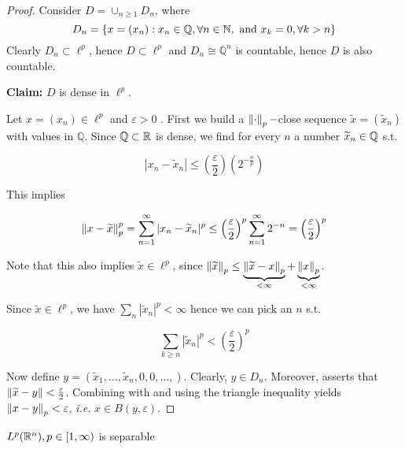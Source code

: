 \documentclass{article}
\begin{document}
\begin{proof}
	Consider \(D = \cup_{n\geq 1} D_n\), where  
	\[ D_n = \{x=(x_n): x_n \in \mathbb{Q}, \forall n \in \mathbb{N}, \ \text{and} \ x_k=0, \forall k >n\}\]
 Clearly $D_n \subset \ell^p$, hence $D\subset \ell^p$ and $D_n \cong \mathbb{Q}^n$ is countable, hence $D$ is also countable.   

\textbf{Claim:} $D$ is dense in $\ell^p$.  

Let $x = (x_n) \in \ell^p$ and $\varepsilon >0$ . First we build a $\left\|{\cdot}\right\|_p-$close sequence $\widetilde{x}=(\widetilde{x}_n)$ with values in $\mathbb{Q}$. Since $\mathbb{Q} \subset \mathbb{R}$ is dense, we find for every $n$ a number $\widetilde{x}_n \in \mathbb{Q}$ s.t.  

$$
|x_n-\widetilde{x}_n| \leq \left(\frac{\varepsilon}{2}\right) (2^{-\frac{n}{p}})
$$  

This implies  

\begin{equation}
\label{1}
    \left\|{x-\widetilde{x}}\right\|_p^p = \sum_{n=1}^{\infty} |x_n-\widetilde{x}_n|^p \leq \left(\frac{\varepsilon}{2}\right)^p \sum_{n=1}^{\infty} 2^{-n}=\left(\frac{\varepsilon}{2}\right)^p
\end{equation}

Note that this also implies $\widetilde{x} \in \ell^p$, since $\left\|{\widetilde{x}}\right\|_p \leq \underbrace{\left\|{\widetilde{x}-x}\right\|_p}_{<\infty}+\underbrace{\left\|{x}\right\|_p}_{<\infty}$.  

Since $\widetilde{x} \in \ell^p$, we have $\sum_n |\widetilde{x}_n|^p < \infty$ hence we can pick an $n$ s.t.  

\begin{equation}
\label{2}
    \sum_{k\geq n} |\widetilde{x}_n|^p < \left(\frac{\varepsilon}{2}\right)^p
\end{equation}

Now define $y = (\widetilde{x}_1, \ldots, \widetilde{x}_n, 0, 0, \ldots,)$. Clearly, $y \in D_n$. Moreover,  asserts that $\left\|{\widetilde{x}-y}\right\| < \frac{\varepsilon}{2}$. Combining with  and using the triangle inequality yields $\left\|{x-y}\right\|_p < \varepsilon$, \textit{i.e.} $x\in B(y, \varepsilon)$.  
\end{proof}  

\begin{proposition}
    $L^p(\mathbb{R}^n), p \in [1, \infty)$ is separable
\end{proposition}  
\end{document}

